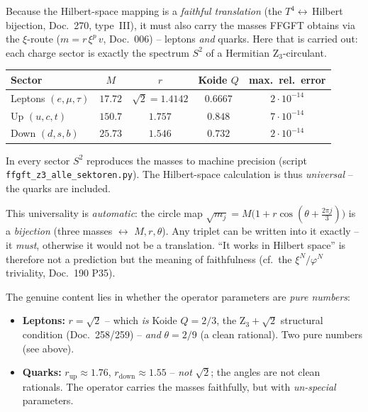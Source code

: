 Because the Hilbert-space mapping is a \emph{faithful translation} (the
$T^4\!\leftrightarrow$\,Hilbert bijection, Doc.~270, type~III), it must also
carry the masses FFGFT obtains via the $\xi$-route ($m=r\,\xi^p\,v$, Doc.~006)
-- leptons \emph{and} quarks. Here that is carried out: each charge sector is
exactly the spectrum $S^2$ of a Hermitian Z$_3$-circulant.

\begin{center}
\begin{tabular}{lcccc}
\toprule
Sector & $M$ & $r$ & Koide $Q$ & max.\ rel.\ error \\
\midrule
Leptons $(e,\mu,\tau)$ & $17.72$ & $\sqrt2=1.4142$ & $0.6667$ & $2\cdot10^{-14}$ \\
Up $(u,c,t)$           & $150.7$ & $1.757$         & $0.848$  & $7\cdot10^{-14}$ \\
Down $(d,s,b)$         & $25.73$ & $1.546$         & $0.732$  & $2\cdot10^{-14}$ \\
\bottomrule
\end{tabular}
\end{center}

In every sector $S^2$ reproduces the masses to machine precision (script
\texttt{ffgft\_z3\_alle\_sektoren.py}). The Hilbert-space calculation is thus
\emph{universal} -- the quarks are included.

\begin{warningboxenv}
This universality is \emph{automatic}: the circle map
$\sqrt{m_j}=M\bigl(1+r\cos(\theta+\tfrac{2\pi j}{3})\bigr)$ is a
\emph{bijection} (three masses $\leftrightarrow$ $M,r,\theta$). Any triplet can
be written into it exactly -- it \emph{must}, otherwise it would not be a
translation. \enquote{It works in Hilbert space} is therefore not a prediction
but the meaning of faithfulness (cf.\ the $\xi^N/\varphi^N$ triviality,
Doc.~190 P35).
\end{warningboxenv}

The genuine content lies in whether the operator parameters are \emph{pure
numbers}:
\begin{itemize}
  \item \textbf{Leptons:} $r=\sqrt2$ -- which \emph{is} Koide $Q=2/3$, the
        Z$_3+\sqrt2$ structural condition (Doc.~258/259) -- \emph{and}
        $\theta=2/9$ (a clean rational). Two pure numbers (see above).
  \item \textbf{Quarks:} $r_{\text{up}}\approx1.76$,
        $r_{\text{down}}\approx1.55$ -- \emph{not} $\sqrt2$; the angles are not
        clean rationals. The operator carries the masses faithfully, but with
        \emph{un-special} parameters.
\end{itemize}

